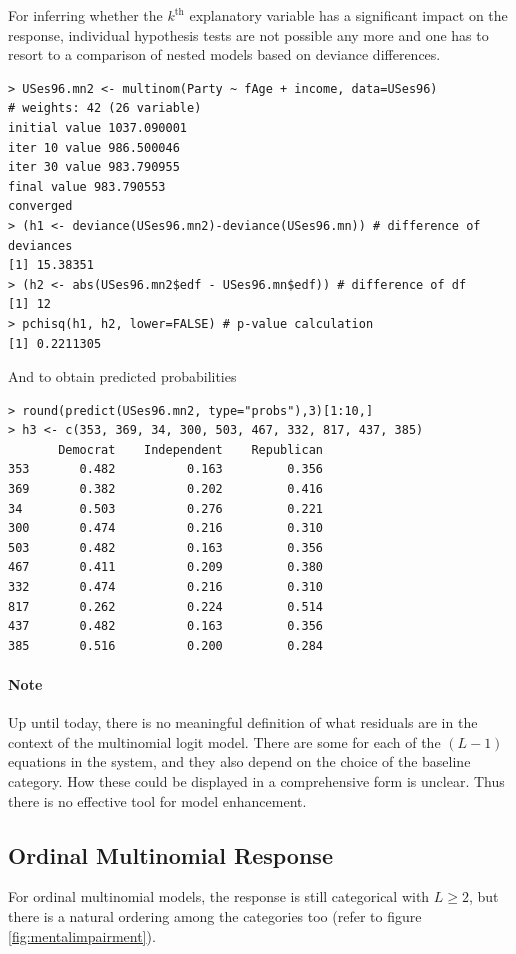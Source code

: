 \documentclass[11pt]{article}
\begin{document}
For inferring whether the $k^{\text{th}}$ explanatory variable has a significant impact on the response, individual hypothesis tests are not possible any more and one has to resort to a comparison of nested models based on deviance differences.

\begin{verbatim}
> USes96.mn2 <- multinom(Party ~ fAge + income, data=USes96)
# weights: 42 (26 variable)
initial value 1037.090001
iter 10 value 986.500046
iter 30 value 983.790955
final value 983.790553
converged
> (h1 <- deviance(USes96.mn2)-deviance(USes96.mn)) # difference of deviances
[1] 15.38351
> (h2 <- abs(USes96.mn2$edf - USes96.mn$edf)) # difference of df
[1] 12
> pchisq(h1, h2, lower=FALSE) # p-value calculation
[1] 0.2211305
\end{verbatim}

And to obtain predicted probabilities

\begin{verbatim}
> round(predict(USes96.mn2, type="probs"),3)[1:10,]
> h3 <- c(353, 369, 34, 300, 503, 467, 332, 817, 437, 385)
       Democrat    Independent    Republican
353       0.482          0.163         0.356
369       0.382          0.202         0.416
34        0.503          0.276         0.221
300       0.474          0.216         0.310
503       0.482          0.163         0.356
467       0.411          0.209         0.380
332       0.474          0.216         0.310
817       0.262          0.224         0.514
437       0.482          0.163         0.356
385       0.516          0.200         0.284
\end{verbatim}

\paragraph{Note} Up until today, there is no meaningful definition of what residuals are in the context of the multinomial logit model. There are some for each of the $(L-1)$ equations in the system, and they also depend on the choice of the baseline category. How these could be displayed in a comprehensive form is unclear. Thus there is no effective tool for model enhancement.

\subsection{Ordinal Multinomial Response}

For ordinal multinomial models, the response is still categorical with $L\geq 2$, but there is a natural ordering among the categories too (refer to figure \ref{fig:mentalimpairment}).
\end{document}
